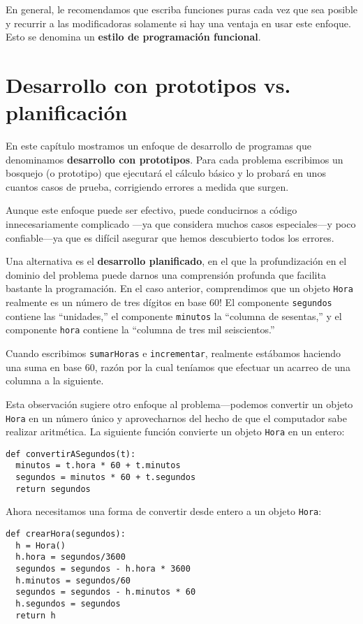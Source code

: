 En general, le recomendamos que escriba funciones puras cada vez que
sea posible y recurrir a las modificadoras solamente si hay una ventaja
en usar este enfoque. Esto se denomina un \textbf{estilo de programación
funcional}.

\section{Desarrollo con prototipos vs. planificación}

\label{convert} 

En este capítulo mostramos un enfoque de desarrollo de programas que
denominamos \textbf{desarrollo con prototipos}. Para cada problema
escribimos un bosquejo (o prototipo) que ejecutará el cálculo básico
y lo probará en unos cuantos casos de prueba, corrigiendo errores
a medida que surgen.

Aunque este enfoque puede ser efectivo, puede conducirnos a código
innecesariamente complicado —ya que considera muchos casos especiales—y
poco confiable—ya que es difícil asegurar que hemos descubierto todos
los errores.

Una alternativa es el \textbf{desarrollo planificado}, en el que la
profundización en el dominio del problema puede darnos una comprensión
profunda que facilita bastante la programación. En el caso anterior,
comprendimos que un objeto \texttt{Hora} realmente es un número de
tres dígitos en base 60! El componente \texttt{segundos} contiene
las ``unidades,'' el componente \texttt{minutos} la ``columna de
sesentas,'' y el componente \texttt{hora} contiene la ``columna
de tres mil seiscientos.''

Cuando escribimos \texttt{sumarHoras} e \texttt{incrementar}, realmente
estábamos haciendo una suma en base 60, razón por la cual teníamos
que efectuar un acarreo de una columna a la siguiente.

Esta observación sugiere otro enfoque al problema—podemos convertir
un objeto \texttt{Hora} en un número único y aprovecharnos del hecho
de que el computador sabe realizar aritmética. La siguiente función
convierte un objeto \texttt{Hora} en un entero:
\begin{lstlisting}
def convertirASegundos(t):
  minutos = t.hora * 60 + t.minutos
  segundos = minutos * 60 + t.segundos
  return segundos
\end{lstlisting}

Ahora necesitamos una forma de convertir desde entero a un objeto
\texttt{Hora}:
\begin{lstlisting}
def crearHora(segundos):
  h = Hora()
  h.hora = segundos/3600
  segundos = segundos - h.hora * 3600
  h.minutos = segundos/60
  segundos = segundos - h.minutos * 60
  h.segundos = segundos
  return h
\end{lstlisting}

